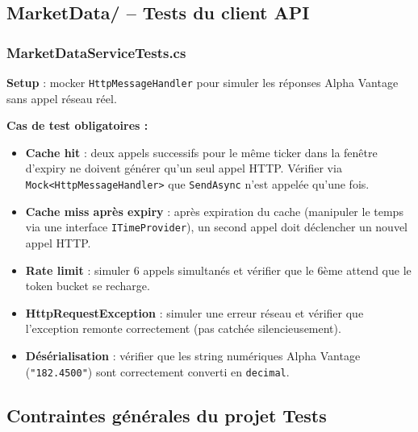 \documentclass[a4paper,11pt]{article}
\newcommand{\cs}[1]{\texttt{\color{codeinline}#1}}
\begin{document}
\subsection{MarketData/ -- Tests du client API}

\subsubsection{MarketDataServiceTests.cs}

\textbf{Setup} : mocker \cs{HttpMessageHandler} pour simuler les réponses
Alpha Vantage sans appel réseau réel.

\textbf{Cas de test obligatoires :}
\begin{itemize}
  \item \textbf{Cache hit} : deux appels successifs pour le même ticker dans
        la fenêtre d'expiry ne doivent générer qu'un seul appel HTTP.
        Vérifier via \cs{Mock<HttpMessageHandler>} que \cs{SendAsync}
        n'est appelée qu'une fois.
  \item \textbf{Cache miss après expiry} : après expiration du cache
        (manipuler le temps via une interface \cs{ITimeProvider}), un second
        appel doit déclencher un nouvel appel HTTP.
  \item \textbf{Rate limit} : simuler 6 appels simultanés et vérifier que
        le 6ème attend que le token bucket se recharge.
  \item \textbf{HttpRequestException} : simuler une erreur réseau et vérifier
        que l'exception remonte correctement (pas catchée silencieusement).
  \item \textbf{Désérialisation} : vérifier que les string numériques
        Alpha Vantage (\texttt{"182.4500"}) sont correctement converti en
        \cs{decimal}.
\end{itemize}

\subsection{Contraintes générales du projet Tests}
\end{document}
